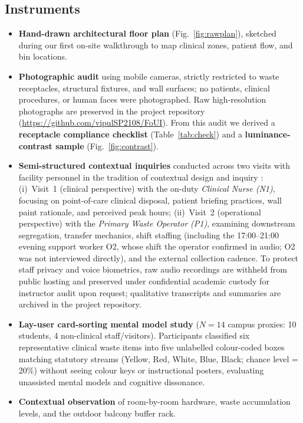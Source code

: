\documentclass[10pt,twocolumn,a4paper]{article}
\newcommand{\figref}[1]{Fig.~\ref{#1}}
\newcommand{\tabref}[1]{Table~\ref{#1}}
\begin{document}
\subsection{Instruments}
\begin{itemize}
\item \textbf{Hand-drawn architectural floor plan} (\figref{fig:rawplan}), sketched during our first on-site walkthrough to map clinical zones, patient flow, and bin locations.
\item \textbf{Photographic audit} using mobile cameras, strictly restricted to waste receptacles, structural fixtures, and wall surfaces; no patients, clinical procedures, or human faces were photographed. Raw high-resolution photographs are preserved in the project repository (\url{https://github.com/vipulSP2108/FoUI}). From this audit we derived a \textbf{receptacle compliance checklist} (\tabref{tab:check}) and a \textbf{luminance-contrast sample} (\figref{fig:contrast}).
\item \textbf{Semi-structured contextual inquiries} conducted across two visits with facility personnel in the tradition of contextual design and inquiry \cite{beyer1998}: (i)~Visit~1 (clinical perspective) with the on-duty \emph{Clinical Nurse (N1)}, focusing on point-of-care clinical disposal, patient briefing practices, wall paint rationale, and perceived peak hours; (ii)~Visit~2 (operational perspective) with the \emph{Primary Waste Operator (P1)}, examining downstream segregation, transfer mechanics, shift staffing (including the 17:00--21:00 evening support worker O2, whose shift the operator confirmed in audio; O2 was not interviewed directly), and the external collection cadence. To protect staff privacy and voice biometrics, raw audio recordings are withheld from public hosting and preserved under confidential academic custody for instructor audit upon request; qualitative transcripts and summaries are archived in the project repository.
\item \textbf{Lay-user card-sorting mental model study} ($N=14$ campus proxies: 10 students, 4 non-clinical staff/visitors). Participants classified six representative clinical waste items into five unlabelled colour-coded boxes matching statutory streams (Yellow, Red, White, Blue, Black; chance level = 20\%) without seeing colour keys or instructional posters, evaluating unassisted mental models and cognitive dissonance.
\item \textbf{Contextual observation} of room-by-room hardware, waste accumulation levels, and the outdoor balcony buffer rack.
\end{itemize}
\end{document}
